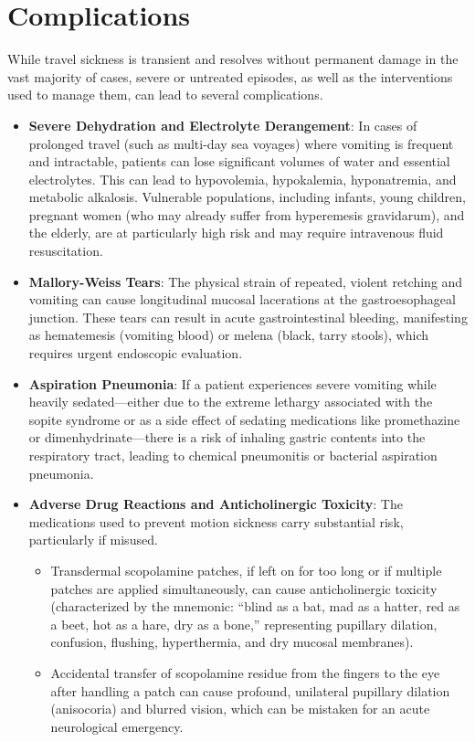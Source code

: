 \section*{Complications}
While travel sickness is transient and resolves without permanent damage in the vast majority of cases, severe or untreated episodes, as well as the interventions used to manage them, can lead to several complications.
\begin{itemize}
    \item \textbf{Severe Dehydration and Electrolyte Derangement}: In cases of prolonged travel (such as multi-day sea voyages) where vomiting is frequent and intractable, patients can lose significant volumes of water and essential electrolytes. This can lead to hypovolemia, hypokalemia, hyponatremia, and metabolic alkalosis. Vulnerable populations, including infants, young children, pregnant women (who may already suffer from hyperemesis gravidarum), and the elderly, are at particularly high risk and may require intravenous fluid resuscitation.
    \item \textbf{Mallory-Weiss Tears}: The physical strain of repeated, violent retching and vomiting can cause longitudinal mucosal lacerations at the gastroesophageal junction. These tears can result in acute gastrointestinal bleeding, manifesting as hematemesis (vomiting blood) or melena (black, tarry stools), which requires urgent endoscopic evaluation.
    \item \textbf{Aspiration Pneumonia}: If a patient experiences severe vomiting while heavily sedated—either due to the extreme lethargy associated with the sopite syndrome or as a side effect of sedating medications like promethazine or dimenhydrinate—there is a risk of inhaling gastric contents into the respiratory tract, leading to chemical pneumonitis or bacterial aspiration pneumonia.
    \item \textbf{Adverse Drug Reactions and Anticholinergic Toxicity}: The medications used to prevent motion sickness carry substantial risk, particularly if misused.
    \begin{itemize}
        \item Transdermal scopolamine patches, if left on for too long or if multiple patches are applied simultaneously, can cause anticholinergic toxicity (characterized by the mnemonic: ``blind as a bat, mad as a hatter, red as a beet, hot as a hare, dry as a bone,'' representing pupillary dilation, confusion, flushing, hyperthermia, and dry mucosal membranes).
        \item Accidental transfer of scopolamine residue from the fingers to the eye after handling a patch can cause profound, unilateral pupillary dilation (anisocoria) and blurred vision, which can be mistaken for an acute neurological emergency.

\end{itemize}
\end{itemize}
